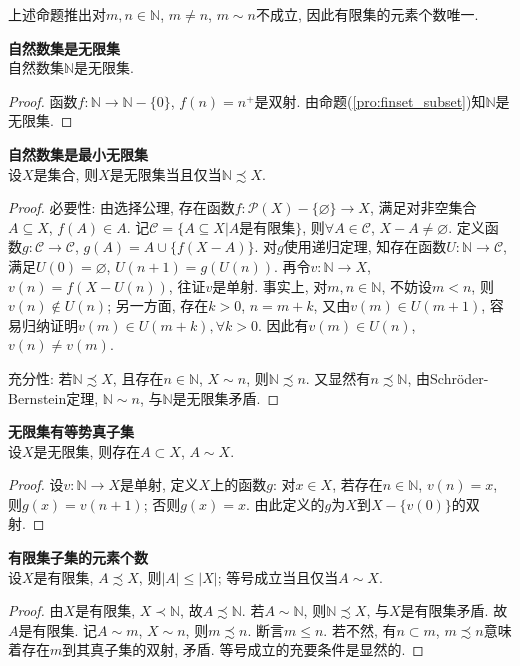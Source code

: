 上述命题推出对$m,n\in \mathbb{N}$, $m\neq n$, $m\sim n$不成立, 因此有限集的元素个数唯一. 

\begin{pro} \textbf{自然数集是无限集}\\
自然数集$\mathbb{N}$是无限集. 
\end{pro}
\begin{proof}
\par 函数$f:\mathbb{N} \to  \mathbb{N}-\{0\}$, $f(n)=n^+$是双射. 由命题(\ref{pro:finset_subset})知$\mathbb{N}$是无限集. 
\end{proof}

\begin{pro} \textbf{自然数集是最小无限集}\\
设$X$是集合, 则$X$是无限集当且仅当$\mathbb{N}\precsim X$.
\label{pro:mininfset}
\end{pro}
\begin{proof}
\par 必要性: 由选择公理, 存在函数$f:\mathcal{P}(X)-\{\varnothing\}\to X$, 满足对非空集合$A\subseteq X$, $f(A)\in A$. 记$\mathcal{C}=\{A\subseteq X\vert A\text{是有限集}\}$, 则$\forall A\in \mathcal{C}$, $X-A\neq \varnothing$. 定义函数$g:\mathcal{C}\to \mathcal{C}$, $g(A)=A\cup \{f(X-A)\}$. 对$g$使用递归定理, 知存在函数$U:\mathbb{N} \to  \mathcal{C}$, 满足$U(0)=\varnothing$, $U(n+1)=g(U(n))$. 再令$v:\mathbb{N} \to  X$, $v(n)=f(X-U(n))$, 往证$v$是单射. 事实上, 对$m,n\in \mathbb{N}$, 不妨设$m<n$, 则$v(n)\notin U(n)$; 另一方面, 存在$k>0$, $n=m+k$, 又由$v(m)\in U(m+1)$, 容易归纳证明$v(m)\in U(m+k), \forall k>0$. 因此有$v(m)\in U(n)$, $v(n)\neq v(m)$.
\par 充分性: 若$\mathbb{N}\precsim X$, 且存在$n\in \mathbb{N}$, $X\sim n$, 则$\mathbb{N}\precsim n$. 又显然有$n\precsim \mathbb{N}$, 由Schröder-Bernstein定理, $\mathbb{N}\sim n$, 与$\mathbb{N}$是无限集矛盾. 
\end{proof}

\begin{col} \textbf{无限集有等势真子集}\\
设$X$是无限集, 则存在$A\subset X$, $A\sim X$.
\end{col}
\begin{proof}
设$v: \mathbb{N} \to  X$是单射, 定义$X$上的函数$g$: 对$x\in X$, 若存在$n\in \mathbb{N}$, $v(n)=x$, 则$g(x)=v(n+1)$; 否则$g(x)=x$. 由此定义的$g$为$X$到$X-\{v(0)\}$的双射. 
\end{proof}

\begin{col} \textbf{有限集子集的元素个数}\\
设$X$是有限集, $A\precsim X$, 则$|A|\le |X|$; 等号成立当且仅当$A\sim X$.
\end{col}
\begin{proof}
\par 由$X$是有限集, $X\prec \mathbb{N}$, 故$A\precsim \mathbb{N}$. 若$A\sim \mathbb{N}$, 则$\mathbb{N}\precsim X$, 与$X$是有限集矛盾. 故$A$是有限集. 记$A\sim m$, $X\sim n$, 则$m \precsim n$. 断言$m\le n$. 若不然, 有$n\subset m$, $m \precsim n$意味着存在$m$到其真子集的双射, 矛盾. 等号成立的充要条件是显然的. 
\end{proof}

